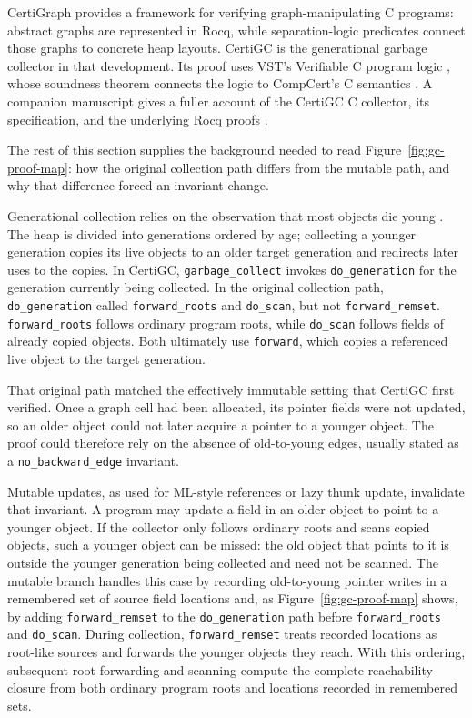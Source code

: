 \documentclass[acmsmall,nonacm]{acmart}
\newcommand{\Rocq}{Rocq}
\newcommand{\CertiGC}{CertiGC}
\newcommand{\CertiGraph}{CertiGraph}
\newcommand{\VST}{VST}
\begin{document}
\CertiGraph{} \citep{wang2019certigraph} provides a framework for verifying
graph-manipulating C programs: abstract graphs are represented in \Rocq{}, while
separation-logic predicates connect those graphs to concrete heap layouts.
\CertiGC{} is the generational garbage collector in that development.  Its proof
uses \VST{}'s Verifiable C program logic \citep{appel2014programlogics}, whose
soundness theorem connects the logic to CompCert's C semantics
\citep{leroy2009compcert}.
A companion manuscript gives a fuller account of the \CertiGC{} C collector, its
specification, and the underlying \Rocq{} proofs \citep{wang2026certigc}.

The rest of this section supplies the background needed to read
Figure~\ref{fig:gc-proof-map}: how the original collection path differs from
the mutable path, and why that difference forced an invariant change.

Generational collection relies on the observation that most objects die young
\citep[Chapter~9]{jones2023gchandbook}.  The heap is divided into generations
ordered by age; collecting a younger generation copies its live objects to an
older target generation and redirects later uses to the copies.  In
\CertiGC{}, \texttt{garbage\_collect} invokes \texttt{do\_generation} for the
generation currently being collected.  In the original collection path,
\texttt{do\_generation} called \texttt{forward\_roots} and \texttt{do\_scan},
but not \texttt{forward\_remset}.  \texttt{forward\_roots} follows ordinary
program roots, while \texttt{do\_scan} follows fields of already copied objects.
Both ultimately use \texttt{forward}, which copies a referenced live object to
the target generation.

That original path matched the effectively immutable setting that CertiGC first
verified.  Once a graph cell had been allocated, its pointer fields were not
updated, so an older object could not later acquire a pointer to a younger
object.  The proof could therefore rely on the absence of old-to-young edges,
usually stated as a \texttt{no\_backward\_edge} invariant.

Mutable updates, as used for ML-style references or lazy thunk update,
invalidate that invariant.  A program may update a field in an older object to
point to a younger object.  If the collector only follows ordinary roots and
scans copied objects, such a younger object can be missed: the old object that
points to it is outside the younger generation being collected and need not be
scanned.  The mutable branch handles this case by recording old-to-young
pointer writes in a remembered set of source field locations and, as
Figure~\ref{fig:gc-proof-map} shows, by adding \texttt{forward\_remset} to the
\texttt{do\_generation} path before \texttt{forward\_roots} and
\texttt{do\_scan}.  During collection, \texttt{forward\_remset} treats recorded
locations as root-like sources and forwards the younger objects they reach.
With this ordering, subsequent root forwarding and scanning compute the complete
reachability closure from both ordinary program roots and locations recorded in
remembered sets.
\end{document}
